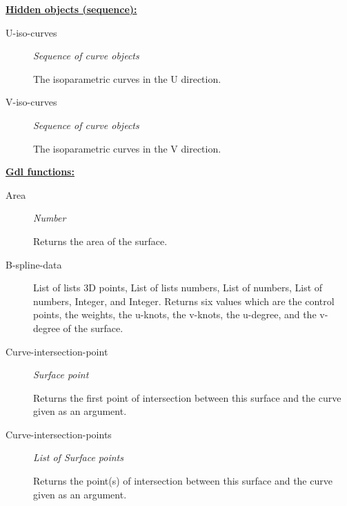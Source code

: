 \documentclass [11pt]{book}
\begin{document}
\begin{itemize}
\begin{description}
\end{description}






\textbf{
\underline{Hidden objects (sequence):}}

\begin{description}

\item [U-iso-curves]
\emph{Sequence of curve objects}

 The isoparametric curves in the U direction.




\item [V-iso-curves]
\emph{Sequence of curve objects}

 The isoparametric curves in the V direction.




\end{description}






\textbf{
\underline{Gdl functions:}}

\begin{description}

\item [Area]
\emph{Number}

 Returns the area of the surface.




\item [B-spline-data]

List of lists 3D points, List of lists numbers, List of numbers,
List of numbers, Integer, and Integer.
Returns six values which are the control points, the weights, the u-knots,
the v-knots, the u-degree, and the v-degree of the surface.




\item [Curve-intersection-point]
\emph{Surface point}

 Returns the first point of intersection between
this surface and the curve given as an argument.




\item [Curve-intersection-points]
\emph{List of Surface points}

 Returns the point(s) of intersection between
this surface and the curve given as an argument.





\end{description}
\end{itemize}
\end{document}
